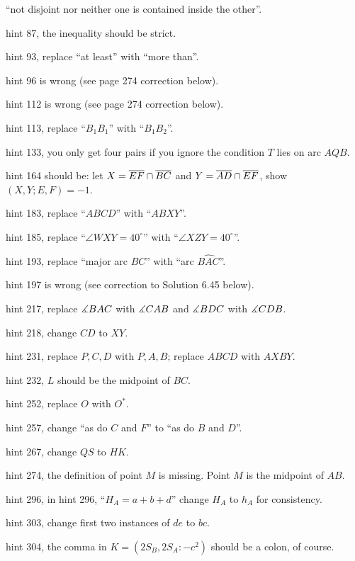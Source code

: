 \documentclass[11pt]{scrartcl}
\begin{document}
\begin{description}
  ``not disjoint nor neither one is contained inside the other''.
\item[p.\  223] hint 87, the inequality should be strict.
\item[p.\  223] hint 93, replace ``at least'' with ``more than''.
\item[p.\  223] hint 96 is wrong (see page 274 correction below).
\item[p.\  224] hint 112 is wrong (see page 274 correction below).
\item[p.\  224] hint 113, replace ``$B_1B_1$'' with ``$B_1B_2$''.
\item[p.\  224] hint 133, you only get four pairs if you ignore the condition $T$ lies on arc $AQB$.
\item[p.\  225] hint 164 should be: let $X = \overline{EF} \cap \overline{BC}$ and $Y = \overline{AD} \cap \overline{EF}$,
  show $(X,Y;E,F) = -1$.
\item[p.\  226] hint 183, replace ``$ABCD$'' with ``$ABXY$''.
\item[p.\  226] hint 185, replace ``$\angle WXY = 40^{\circ}$''
  with ``$\angle XZY = 40^{\circ}$''.
\item[p.\  226] hint 193, replace ``major arc $BC$'' with ``arc $\widehat{BAC}$''.
\item[p.\  226] hint 197 is wrong (see correction to Solution 6.45 below).
\item[p.\  226] hint 217, replace $\measuredangle BAC$ with $\measuredangle CAB$ and $\measuredangle BDC$ with $\measuredangle CDB$.
\item[p.\  226] hint 218, change $CD$ to $XY$.
\item[p.\  227] hint 231, replace $P,C,D$ with $P,A,B$; replace $ABCD$ with $AXBY$.
\item[p.\  227] hint 232, $L$ should be the midpoint of $BC$.
\item[p.\  227] hint 252, replace $O$ with $O^\ast$.
\item[p.\  228] hint 257, change ``as do $C$ and $F$'' to ``as do $B$ and $D$''.
\item[p.\  228] hint 267, change $QS$ to $HK$.
\item[p.\  228] hint 274, the definition of point $M$ is missing.
  Point $M$ is the midpoint of $AB$.
\item[p.\  229] hint 296, in hint 296, ``$H_A = a + b + d$'' change $H_A$ to $h_A$ for consistency.
\item[p.\  229] hint 303, change first two instances of $de$ to $bc$.
\item[p.\  229] hint 304, the comma in $K = (2S_B, 2S_A: -c^2)$ should be a colon, of course.

\end{description}
\end{document}
